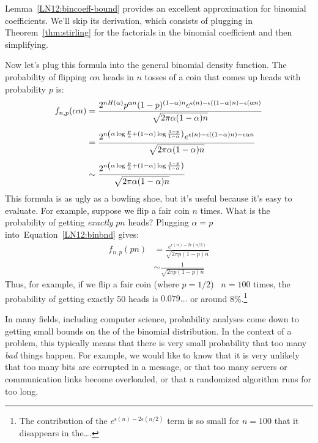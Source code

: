 Lemma~\eqref{LN12:bincoeff-bound} provides an excellent approximation
for binomial coefficients.  We'll skip its derivation, which consists
of plugging in Theorem~\ref{thm:stirling} for the factorials in the
binomial coefficient and then simplifying.

Now let's plug this formula into the general binomial density
function.  The probability of flipping $\alpha n$ heads in $n$ tosses
of a coin that comes up heads with probability $p$ is:
\begin{align}
f_{n, p}(\alpha n)
    &= \frac{ 2^{n H(\alpha)} p^{\alpha n} (1 - p)^{(1 - \alpha)n}
                e^{\epsilon(n) - \epsilon((1 - \alpha) n) -
                  \epsilon(\alpha n)}}
            { \sqrt{2 \pi \alpha (1 - \alpha) n} } \notag\\[4pt]
    &= \frac{ 2^{n \left(\alpha \log\frac{p}{\alpha}
                    + (1 - \alpha) \log \frac{1 - p}{1 - \alpha}\right)} 
                e^{\epsilon(n) - \epsilon((1 - \alpha)n) -
                  \epsilon{\alpha n}}
            }
            { \sqrt{2 \pi \alpha (1 - \alpha) n} } \notag \\[4pt]
    &\sim \frac{ 2^{n \left(\alpha \log\frac{p}{\alpha}
                    + (1 - \alpha) \log \frac{1 - p}{1 - \alpha}\right)} 
            }
            { \sqrt{2 \pi \alpha (1 - \alpha) n} } \label{LN12:binbnd}
\end{align}
%
%
This formula is as ugly as a bowling shoe, but it's useful because
it's easy to evaluate.  For example, suppose we flip a fair coin $n$
times.  What is the probability of getting \emph{exactly} $pn$ heads?
Plugging $\alpha = p$ into~Equation~\ref{LN12:binbnd} gives:
%
\begin{align*}
f_{n, p}(pn)
    &= \frac{ e^{\epsilon(n) - 2 \epsilon(n/2)} }
            { \sqrt{2 \pi p (1 - p) n} } \\[4pt]
    &\sim \frac{1}{\sqrt{2 \pi p (1 - p) n} }
\end{align*}
%
Thus, for example, if we flip a fair coin (where $p = 1/2$) \ $n =
100$ times, the probability of getting exactly 50 heads is
$0.079\dots$ or around 8\%.\footnote{The contribution of the
  $e^{\epsilon(n) - 2 \epsilon(n/2)}$ term is so small for $n = 100$
  that it disappears in the\dots.}

In many fields, including computer science, probability analyses come
down to getting small bounds on the  of the binomial
distribution.  In the context of a problem, this typically means that
there is very small probability that too many \emph{bad} things
happen.  For example, we would like to know that it is very unlikely
that too many bits are corrupted in a message, or that too many
servers or communication links become overloaded, or that a randomized
algorithm runs for too long.

